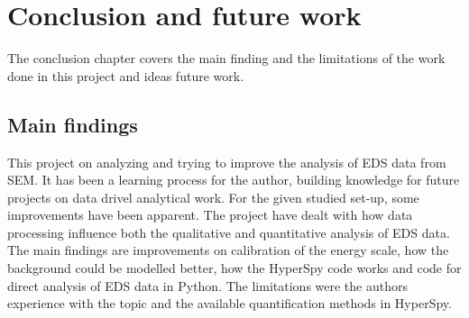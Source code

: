 
\chapter{Conclusion and future work}
\label{chap:conclusion}


The conclusion chapter covers the main finding and the limitations of the work done in this project and ideas future work.







\section{Main findings}
\label{sec:mainfindings}


This project on analyzing and trying to improve the analysis of EDS data from SEM.
It has been a learning process for the author, building knowledge for future projects on data drivel analytical work.
For the given studied set-up, some improvements have been apparent.
The project have dealt with how data processing influence both the qualitative and quantitative analysis of EDS data.
The main findings are improvements on calibration of the energy scale, how the background could be modelled better, how the HyperSpy code works and code for direct analysis of EDS data in Python.
The limitations were the authors experience with the topic and the available quantification methods in HyperSpy.


